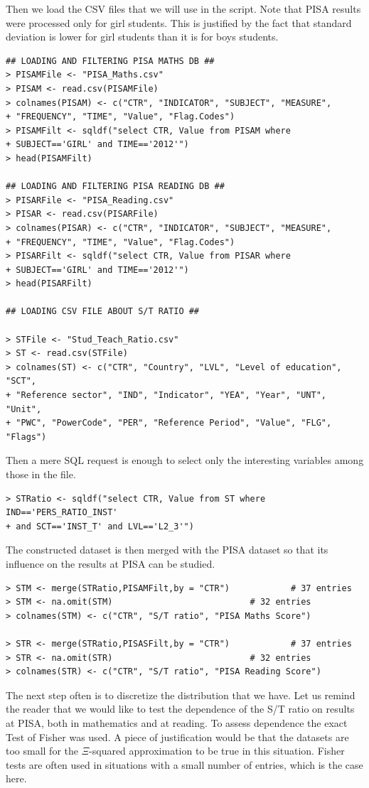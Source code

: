 \documentclass[12pt,a4paper]{article}
\begin{document}
Then we load the CSV files that we will use in the script. Note that PISA results were processed only for girl students. This is justified by the fact that standard deviation is lower for girl students than it is for boys students.
\begin{lstlisting}
## LOADING AND FILTERING PISA MATHS DB ##
> PISAMFile <- "PISA_Maths.csv"
> PISAM <- read.csv(PISAMFile)
> colnames(PISAM) <- c("CTR", "INDICATOR", "SUBJECT", "MEASURE",
+ "FREQUENCY", "TIME", "Value", "Flag.Codes")
> PISAMFilt <- sqldf("select CTR, Value from PISAM where
+ SUBJECT=='GIRL' and TIME=='2012'")
> head(PISAMFilt)

## LOADING AND FILTERING PISA READING DB ##
> PISARFile <- "PISA_Reading.csv"
> PISAR <- read.csv(PISARFile)
> colnames(PISAR) <- c("CTR", "INDICATOR", "SUBJECT", "MEASURE",
+ "FREQUENCY", "TIME", "Value", "Flag.Codes")
> PISARFilt <- sqldf("select CTR, Value from PISAR where
+ SUBJECT=='GIRL' and TIME=='2012'")
> head(PISARFilt)

## LOADING CSV FILE ABOUT S/T RATIO ##

> STFile <- "Stud_Teach_Ratio.csv"
> ST <- read.csv(STFile)
> colnames(ST) <- c("CTR", "Country", "LVL", "Level of education", "SCT",
+ "Reference sector", "IND", "Indicator", "YEA", "Year", "UNT", "Unit",
+ "PWC", "PowerCode", "PER", "Reference Period", "Value", "FLG", "Flags")
\end{lstlisting}
Then a mere SQL request is enough to select only the interesting variables among those in the file.
\begin{lstlisting}
> STRatio <- sqldf("select CTR, Value from ST where IND=='PERS_RATIO_INST'
+ and SCT=='INST_T' and LVL=='L2_3'")
\end{lstlisting}
The constructed dataset is then merged with the PISA dataset so that its influence on the results at PISA can be studied.
\begin{lstlisting}
> STM <- merge(STRatio,PISAMFilt,by = "CTR")			# 37 entries
> STM <- na.omit(STM)							# 32 entries
> colnames(STM) <- c("CTR", "S/T ratio", "PISA Maths Score")

> STR <- merge(STRatio,PISASFilt,by = "CTR")			# 37 entries
> STR <- na.omit(STR)							# 32 entries
> colnames(STR) <- c("CTR", "S/T ratio", "PISA Reading Score")
\end{lstlisting}
The next step often is to discretize the distribution that we have. Let us remind the reader that we would like to test the dependence of the S/T ratio on results at PISA, both in mathematics and at reading. To assess dependence the exact Test of Fisher was used. A piece of justification would be that the datasets are too small for the $\Xi$-squared approximation to be true in this situation. Fisher tests are often used in situations with a small number of entries, which is the case here.
\end{document}
